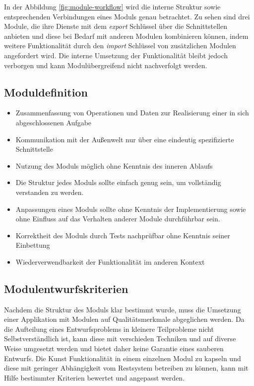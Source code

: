     \newline In der Abbildung \ref{fig:module-workflow} wird die interne Struktur sowie entsprechenden Verbindungen eines Moduls genau betrachtet. Zu sehen sind drei Module, die ihre Dienste mit dem \textit{export} Schlüssel über die Schnittstellen anbieten und diese bei Bedarf mit anderen Modulen kombinieren können, indem weitere Funktionalität durch den \textit{import} Schlüssel von zusätzlichen Modulen angefordert wird. Die interne Umsetzung der Funktionalität bleibt jedoch verborgen und kann Modulübergreifend nicht nachverfolgt werden. 

  \subsection{Moduldefinition}
    \begin{itemize}
      \item Zusammenfassung von Operationen und Daten zur Realisierung einer in sich abgeschlossenen Aufgabe 
      \item Kommunikation mit der Außenwelt nur über eine eindeutig spezifizierte Schnittstelle 
      \item Nutzung des Moduls möglich ohne Kenntnis des inneren Ablaufs 
      \item Die Struktur jedes Moduls sollte einfach genug sein, um vollständig verstanden zu werden.
      \item Anpassungen eines Moduls sollte ohne Kenntnis der Implementierung sowie ohne Einfluss auf das Verhalten anderer Module durchführbar sein.
      \item Korrektheit des Moduls durch Tests nachprüfbar ohne Kenntnis seiner Einbettung
      \item Wiederverwendbarkeit der Funktionalität im anderen Kontext
    \end{itemize}

  \subsection{Modulentwurfskriterien}
    Nachdem die Struktur des Moduls klar bestimmt wurde, muss die Umsetzung einer Applikation mit Modulen auf Qualitätsmerkmale abgeglichen werden. 
    Da die Aufteilung eines Entwurfsproblems in kleinere Teilprobleme nicht Selbstverständlich ist, kann diese mit verschieden Techniken und auf diverse Weise umgesetzt werden und bietet daher keine Garantie eines sauberen Entwurfs. 
    Die Kunst Funktionalität in einem einzelnen Modul zu kapseln und diese mit geringer Abhängigkeit vom Restsystem betreiben zu können, kann mit Hilfe bestimmter Kriterien bewertet und angepasst werden.
    

